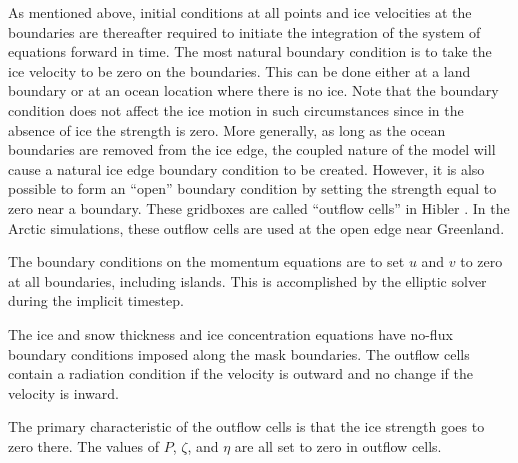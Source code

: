 As mentioned above, initial conditions at all points and ice
velocities at the boundaries are thereafter required to initiate the
integration of the system of equations forward in time.  The most
natural boundary condition is to take the ice velocity to be zero on
the boundaries.  This can be done either at a land boundary or at an
ocean location where there is no ice.  Note that the boundary
condition does not affect the ice motion in such circumstances since
in the absence of ice the strength is zero.  More generally, as long
as the ocean boundaries are removed from the ice edge, the coupled
nature of the model will cause a natural ice edge boundary condition
to be created.  However, it is also possible to form an ``open''
boundary condition by setting the strength equal to zero near a
boundary.  These gridboxes are called ``outflow cells'' in Hibler
\cite{Hibler79}.  In the Arctic simulations, these outflow cells
are used at the open edge near Greenland.

The boundary conditions on the momentum equations are to set $u$ and $v$
to zero at all boundaries, including islands.  This is accomplished
by the elliptic solver during the implicit timestep.

The ice and snow thickness and ice concentration equations have no-flux
boundary conditions imposed along the mask boundaries.  The outflow
cells contain a radiation condition if the velocity is outward and no
change if the velocity is inward.

The primary characteristic of the outflow cells is that the ice
strength goes to zero there.  The values of $P$, $\zeta$, and $\eta$
are all set to zero in outflow cells.
